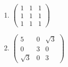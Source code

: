 \documentclass[fleqn]{article}
\begin{document}
\begin{enumerate}
\begin{enumerate}
    \item  $\left( 
    \begin{array}{rrr}
    1 & 1 & 1 \\ 
    1 & 1 & 1 \\ 
    1 & 1 & 1
    \end{array}
    \right) $
    
    \item  $\left( 
    \begin{array}{rrr}
    5 & 0 & \sqrt{3} \\ 
    0 & 3 & 0 \\ 
    \sqrt{3} & 0 & 3
    \end{array}
    \right) $
    \end{enumerate}
    

\end{enumerate}

\pagebreak
\end{document}
